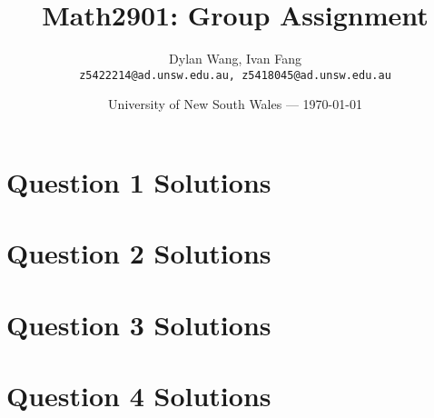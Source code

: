 \documentclass{article}
\title{Math2901: Group Assignment} %
\author{Dylan Wang, Ivan Fang\\ \texttt{z5422214@ad.unsw.edu.au, z5418045@ad.unsw.edu.au}} %
\date{University of New South Wales --- \today} %
\begin{document}
\maketitle %


\section*{Question 1 Solutions} %


\section*{Question 2 Solutions} %


\section*{Question 3 Solutions} %


\section*{Question 4 Solutions} %
\end{document}
